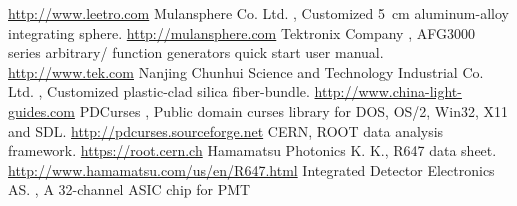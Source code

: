 \documentclass{nst}
\providecommand{\DIFadd}[1]{{\protect\color{yellow} \sf #1}} %
\providecommand{\DIFaddbegin}{} %
\providecommand{\DIFaddend}{} %
\providecommand{\DIFdelbegin}{} %
\providecommand{\DIFdelend}{} %
\begin{document}
\begin{thebibliography}{99}
\DIFdelend \DIFaddbegin \href{http://www.leetro.com/english/}{http://www.leetro.com}
	\DIFaddend {} {Mulansphere Co. Ltd.}\DIFaddbegin \DIFadd{, }\DIFaddend {Customized \DIFdelbegin \DIFdelend \DIFaddbegin \SI{5}{cm} \DIFadd{aluminum-alloy integrating sphere}\DIFaddend }. \DIFdelbegin %
\DIFdelend \DIFaddbegin \href{http://mulansphere.com/e-index.html/}{http://mulansphere.com}
	\DIFaddend {} {Tektronix Company}\DIFdelbegin \DIFdelend \DIFaddbegin \DIFadd{, }\DIFaddend {AFG3000 \DIFdelbegin \DIFdelend \DIFaddbegin \DIFadd{series arbitrary}\DIFaddend /\DIFdelbegin \DIFdelend \DIFaddbegin \DIFadd{function generators quick start user manual}\DIFaddend }. \DIFdelbegin %
\DIFdelend \DIFaddbegin \href{http://www.tek.com/signal-generator/afg3000-function-generator/}{http://www.tek.com}
	\DIFaddend {} Nanjing Chunhui Science and Technology Industrial Co. Ltd.\DIFdelbegin %
\DIFdelend \DIFaddbegin \DIFadd{, Customized plastic-clad silica fiber-bundle.  }\href{http://www.china-light-guides.com/}{http://www.china-light-guides.com}
	\DIFaddend {} PDCurses\DIFdelbegin \DIFdelend \DIFaddbegin \DIFadd{,  Public domain curses library }\DIFaddend for DOS, OS/2, Win32, X11 and SDL. \DIFdelbegin %
\DIFdelend \DIFaddbegin \href{http://pdcurses.sourceforge.net/}{http://pdcurses.sourceforge.net}
	\DIFaddend {} \DIFdelbegin %
\DIFdelend \DIFaddbegin \DIFadd{CERN,  ROOT data analysis framework. }\href{https://root.cern.ch/}{https://root.cern.ch}
	 \DIFadd{Hamamatsu Photonics K. K., R647 data sheet.
	}\href{http://www.hamamatsu.com/us/en/R647.html}{http://www.hamamatsu.com/us/en/R647.html}
	\DIFaddend {} Integrated Detector Electronics AS.\DIFaddbegin \DIFadd{, }\DIFaddend A 32-channel ASIC chip for PMT \DIFdelbegin %

\end{thebibliography}
\end{document}
